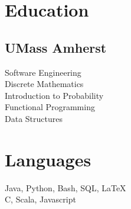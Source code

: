 \documentclass[letterpaper]{deedy-resume} %
\begin{document}
\begin{minipage}[t]{0.32\textwidth} %


\section{Education} 

\subsection{UMass Amherst}







\vspace{1mm}
Software Engineering \\
Discrete Mathematics \\
Introduction to Probability \\
Functional Programming \\
Data Structures \\


\sectionspace %


\section{Languages}


Java, Python, Bash, SQL, \LaTeX\ \\ 
\vspace{2mm}
C, Scala, Javascript \\


\sectionspace %


\end{minipage}
\end{document}
